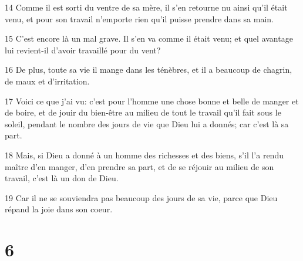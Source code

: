 \par 14 Comme il est sorti du ventre de sa mère, il s'en retourne nu ainsi qu'il était venu, et pour son travail n'emporte rien qu'il puisse prendre dans sa main.
\par 15 C'est encore là un mal grave. Il s'en va comme il était venu; et quel avantage lui revient-il d'avoir travaillé pour du vent?
\par 16 De plus, toute sa vie il mange dans les ténèbres, et il a beaucoup de chagrin, de maux et d'irritation.
\par 17 Voici ce que j'ai vu: c'est pour l'homme une chose bonne et belle de manger et de boire, et de jouir du bien-être au milieu de tout le travail qu'il fait sous le soleil, pendant le nombre des jours de vie que Dieu lui a donnés; car c'est là sa part.
\par 18 Mais, si Dieu a donné à un homme des richesses et des biens, s'il l'a rendu maître d'en manger, d'en prendre sa part, et de se réjouir au milieu de son travail, c'est là un don de Dieu.
\par 19 Car il ne se souviendra pas beaucoup des jours de sa vie, parce que Dieu répand la joie dans son coeur.

\chapter{6}

